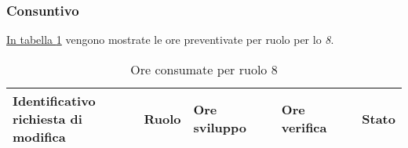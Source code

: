 \subsubsection{Consuntivo}
\hyperref[tab:sprint8_ore_consumate]{In tabella \ref{tab:sprint8_ore_consumate}} vengono mostrate le ore preventivate per ruolo per lo \textit{ 8}.

\begin{table}[H]
    \centering
    \begin{tabular}{| l | l | l | l | l |}
        \hline
            \makecell{\textbf{Identificativo} \\ \textbf{richiesta di modifica}} &
            \textbf{Ruolo} &
            \textbf{Ore sviluppo} &
            \textbf{Ore verifica} &
            \textbf{Stato}\\
        \hline
       
        \hline
    \end{tabular}
    \caption{Ore consumate per ruolo  8}
    \label{tab:sprint8_ore_consumate} 
\end{table}